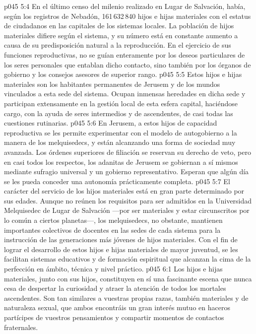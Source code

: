 \vs p045 5:4 \pc En el último censo del milenio realizado en Lugar de Salvación, había, según los registros de Nebadón, 161\,632\,840 hijos e hijas materiales con el estatus de ciudadanos en las capitales de los sistemas locales. La población de hijos materiales difiere según el sistema, y su número está en constante aumento a causa de su predisposición natural a la reproducción. En el ejercicio de sus funciones reproductivas, no se guían enteramente por los deseos particulares de los seres personales que entablan dicho contacto, sino también por los órganos de gobierno y los consejos asesores de superior rango.
\vs p045 5:5 \pc Estos hijos e hijas materiales son los habitantes permanentes de Jerusem y de los mundos vinculados a esta sede del sistema. Ocupan inmensas heredades en dicha sede y participan extensamente en la gestión local de esta esfera capital, haciéndose cargo, con la ayuda de seres intermedios y de ascendentes, de casi todas las cuestiones rutinarias.
\vs p045 5:6 En Jerusem, a estos hijos de capacidad reproductiva se les permite experimentar con el modelo de autogobierno a la manera de los melquisedecs, y están alcanzando una forma de sociedad muy avanzada. Los órdenes superiores de filiación se reservan su derecho de veto, pero en casi todos los respectos, los adanitas de Jerusem se gobiernan a sí mismos mediante sufragio universal y un gobierno representativo. Esperan que algún día se les pueda conceder una autonomía prácticamente completa.
\vs p045 5:7 El carácter del servicio de los hijos materiales está en gran parte determinado por sus edades. Aunque no reúnen los requisitos para ser admitidos en la Universidad Melquisedec de Lugar de Salvación ---por ser materiales y estar circunscritos por lo común a ciertos planetas---, los melquisedecs, no obstante, mantienen importantes colectivos de docentes en las sedes de cada sistema para la instrucción de las generaciones más jóvenes de hijos materiales. Con el fin de lograr el desarrollo de estos hijos e hijas materiales de mayor juventud, se les facilitan sistemas educativos y de formación espiritual que alcanzan la cima de la perfección en ámbito, técnica y nivel práctico.
\vs p045 6:1 Los hijos e hijas materiales, junto con sus hijos, constituyen en sí una fascinante escena que nunca cesa de despertar la curiosidad y atraer la atención de todos los mortales ascendentes. Son tan similares a vuestras propias razas, también materiales y de naturaleza sexual, que ambos encontráis un gran interés mutuo en haceros partícipes de vuestros pensamientos y compartir momentos de contactos fraternales.
